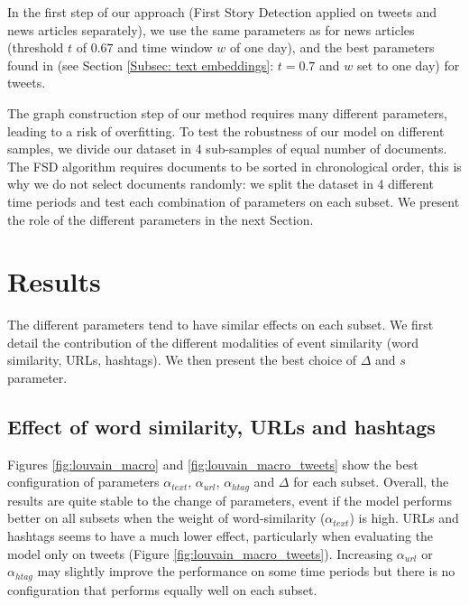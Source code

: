In the first step of our approach (First Story Detection applied on tweets and news articles separately), we use the same parameters as \cite{cage2020production} for news articles (threshold $t$ of $0.67$ and time window $w$ of one day), and the best parameters found in  \cite{mazoyer2020french} (see Section \ref{Subsec: text embeddings}: $t=0.7$ and $w$ set to one day) for tweets.

The graph construction step of our method requires many different parameters, leading to a risk of overfitting. To test the robustness of our model on different samples, we divide our dataset in 4 sub-samples of equal number of documents. The FSD algorithm requires documents to be sorted in chronological order, this is why we do not select documents randomly: we split the dataset in 4 different time periods and test each combination of parameters on each subset. We present the role of the different parameters in the next Section.

\section{Results}

The different parameters tend to have similar effects on each subset. We first detail the contribution of the different modalities of event similarity (word similarity, URLs, hashtags). We then present the best choice of $\Delta$ and $s$ parameter.
\subsection{Effect of word similarity, URLs and hashtags}
Figures \ref{fig:louvain_macro} and \ref{fig:louvain_macro_tweets} show 
the best configuration of parameters $\alpha_{text}$, $\alpha_{url}$, $\alpha_{htag}$ and $\Delta$ for each subset. Overall, the results are quite stable to the change of parameters, event if the model performs better on all subsets when the weight of word-similarity ($\alpha_{text}$) is high. URLs and hashtags seems to have a much lower effect, particularly when evaluating the model only on tweets (Figure \ref{fig:louvain_macro_tweets}). Increasing $\alpha_{url}$ or $\alpha_{htag}$ may slightly improve the performance on some time periods  but there is no configuration that performs equally well on each subset.


